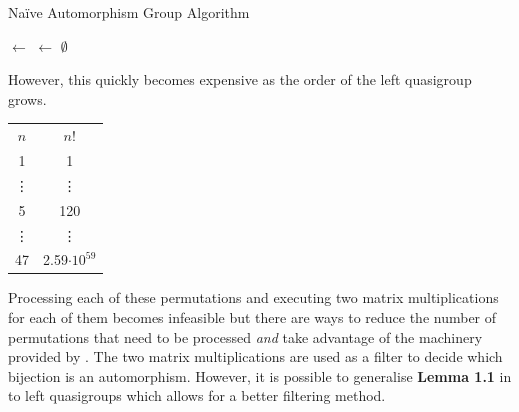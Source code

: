 \begin{algorithm}[H]\label{naiveauto}
\DontPrintSemicolon
\caption{Naïve Automorphism Group Algorithm}
\BlankLine
\BlankLine
\perms $\leftarrow$ \;
\gens $\leftarrow$ $\emptyset$\;
\end{algorithm}\vspace{0.9em}
\noindent However, this quickly becomes expensive as the order of the left quasigroup grows. 
 \begin{center}
        \begin{tabular}{|c|c|}
         $n$ & $n!$\\
         1 & 1\\
         \vdots & \vdots \\
         5 & 120 \\
         \vdots & \vdots \\
         47 & 2.59$\cdot 10^{59}$
         
    \end{tabular}
    
\end{center}
Processing each of these permutations and executing two matrix multiplications for each of them becomes infeasible but there are ways to reduce the number of permutations that need to be processed \emph{and} take advantage of the machinery provided by \magma. The two matrix multiplications are used as a filter to decide which bijection is an automorphism. However, it is possible to generalise \textbf{Lemma 1.1} in \cite{phdStanov} to left quasigroups which allows for a better filtering method. 

